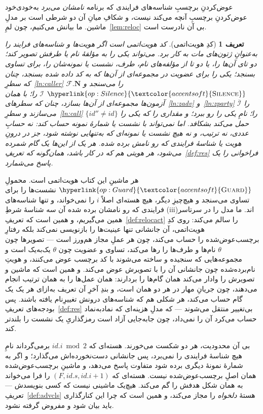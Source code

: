 \documentclass[10pt,oneside,openany]{book}
\newcommand{\admits}{\mathbf{N}}
\newcommand{\F}{\mathcal{F}}
\newcommand{\op}[1]{\textnormal{\textsc{#1}}}
\newcommand{\opl}[1]{\hyperlink{op:#1}{\textcolor{accentsoft}{\op{#1}}}}
\newcommand{\Ids}{\mathcal{I}}
\newcommand{\id}{id}
\theoremstyle{accentdef}
\newtheorem{definition}{تعریف}[chapter]
\theoremstyle{accentplain}
\begin{document}
عوض‌کردنِ برچسبِ شناسه‌های فرایندی که برنامه \emph{نامشان می‌برد} به‌خودی‌خود
عوض‌کردنِ برچسبِ آنچه می‌کند نیست، و شکافِ میانِ آن دو شرطی است بر مدلِ
ماشین. ما بیانش می‌کنیم، چون لمِ~\ref{lem:reloc} بی آن نادرست است.

\begin{definition}[کدِ هویت‌اتمی]\label{def:atomic}
کد \emph{هویت‌اتمی} است اگر هویت‌ها و شناسه‌های فرایند را به‌عنوانِ ژتون‌های
مات به کار برد. می‌تواند یکی را به مؤلفهٔ نام یا طرفش تصویر کند؛ دو تای
آن‌ها را، یا دو تا از مؤلفه‌های نام، طرف، نشست یا نمونه‌شان را، برای تساوی
بسنجد؛ یکی را برای عضویت در مجموعه‌ای از آن‌ها که به کد داده شده بسنجد،
چنان که سطرِ~\ref{ln:caller} $\F.\admits$ را می‌سنجد و $\opl{Silence}$
$\Ids$ را؛ با همان آزمون‌ها مجموعه‌ای از آن‌ها بسازد، چنان که
سطرهای~\ref{ln:zadv} و~\ref{ln:zparty} $\overline{\Ids}$ را می‌سازند و
سطرِ~\ref{ln:call} $\{\id'' \neq \id\}$ را؛ نامِ یکی را رو ببرد؛ و مقداری
را که یکی را حمل می‌کند بشکافد. اما نمی‌تواند با نشست یا شمارهٔ نمونه حساب
کند: نه حسابِ عددی، نه ترتیب، و نه هیچ نشست یا نمونه‌ای که به‌تنهایی نوشته
شود، جز در درونِ هویت یا شناسهٔ فرایندی که رو نامش برده شده. هر یک از
این‌ها یک گام شمرده می‌شود، هر هویتی هم که در کار باشد، همان‌گونه که
تعریفِ~\ref{def:res} فراخوانی را یک پاسخ می‌شمارد.
\end{definition}

هر ماشینِ این کتاب هویت‌اتمی است. محمولِ $\opl{Guard}$ نشست‌ها را برای
تساوی می‌سنجد و هیچ‌چیزِ دیگر، هیچ هسته‌ای اصلاً $i$ را نمی‌خواند، و تنها
شناسه‌های فرایندی که رو نامشان برده شده آن سه شناسهٔ شرطِ (iii)اند. ما مدل
را در سرتاسر همین می‌گیریم، و همین است که تعریفِ~\ref{def:relocact} را
سالم می‌کند: روی کدِ هویت‌اتمی، آن جانشانی تنها عینیت‌ها را بازنویسی
نمی‌کند بلکه رفتارِ برچسب‌عوض‌شده را حساب می‌کند، چون هر عملِ مجاز هم‌ورز
است --- تصویرها چون $\theta$ نام‌ها و طرف‌ها را رها می‌کند، تساوی و عضویت
چون $\theta$ یک‌به‌یک است و مجموعه‌هایی که سنجیده و ساخته می‌شوند با کد
برچسب عوض می‌کنند، و هویتِ نام‌برده‌شده چون جانشانی آن را با تصویرش عوض
می‌کند. و همین است که ماشین و تصویرش را وادار می‌کند همان گام‌ها را
بردارند: همان عمل‌ها را به همان ترتیب انجام می‌دهند، چون جریانِ مهار در هر
دو همان است، و بندِ آخرِ آن تعریف به‌ازای هر یک یک گام حساب می‌کند، هر
شکلی هم که شناسه‌های درونش تغییرِنام یافته باشند. پس بودجه‌های
تعریفِ~\ref{def:res} بی‌تغییر منتقل می‌شوند --- که مدلِ هزینه‌ای که
نماد‌به‌نماد حساب می‌کرد آن را نمی‌داد، چون جابه‌جایی آزاد است رمزگذاریِ یک
نشست را بلندتر کند.

بی آن محدودیت، هر دو شکست می‌خورند. هسته‌ای که $\id.i \bmod 2$ برمی‌گرداند
نامِ هیچ شناسهٔ فرایندی را نمی‌برد، پس جانشانی دست‌نخورده‌اش می‌گذارد؛ و
اگر به شمارهٔ نمونهٔ دیگری برده شود متفاوت پاسخ می‌دهد، و ماشینِ
برچسب‌عوض‌شده همان اصلِ برچسب‌عوض‌شده نیست. هسته‌ای که $(F,\id.s,\id.i +
1)$ را فرا می‌خواند به همان شکل هدفش را گم می‌کند. هیچ‌یک ماشینی نیست که
کسی بنویسدش --- تعریفِ~\ref{def:advcls} هستهٔ \emph{دلخواه} را مجاز
می‌کند، و همین است که چرا این کنارگذاری باید بیان شود و مفروض گرفته نشود.
\end{document}
